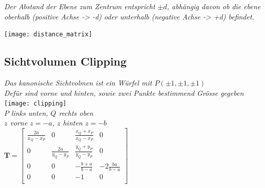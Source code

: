 \textit{Der Abstand der Ebene zum Zentrum entspricht $\pm d$, abhängig davon ob die ebene oberhalb (positive Achse -> -d) oder unterhalb (negative Achse -> +d) befindet.}

\texttt{[image: distance\_matrix]} \\

\subsection{Sichtvolumen Clipping}

\textit{Das kanonische Sichtvolmen ist ein Würfel mit $P(\pm 1, \pm 1, \pm 1)$} \\
\textit{Defür sind vorne und hinten, sowie zwei Punkte bestimmend Grösse gegeben} \\

\texttt{[image: clipping]} \\

\textit{$P$ links unten, $Q$ rechts oben} \\
\textit{$z$ vorne $z=-a$, $z$ hinten $z=-b$} \\

$\mathbf{T} = \begin{bmatrix}
    \frac{2a}{x_Q - x_P} & 0 & \frac{x_Q + x_P}{x_Q - x_P} & 0 \\
    0 & \frac{2a}{y_Q - y_P} & \frac{y_Q + y_P}{y_Q - y_P} & 0 \\
    0 & 0 & -\frac{b+a}{b-a} & -2\frac{ba}{b-a} \\
    0 & 0 & -1 & 0 \\
\end{bmatrix}$